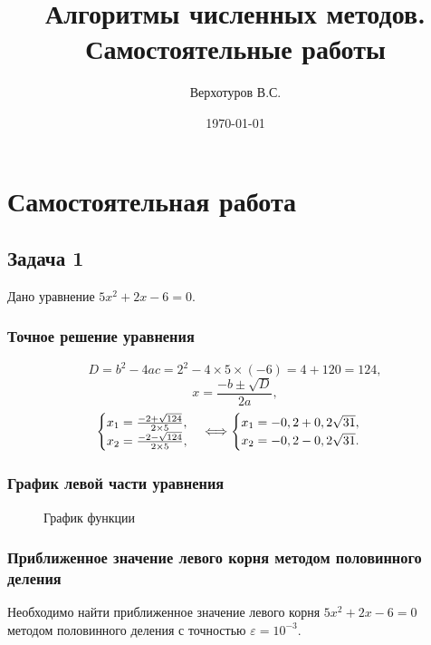 \documentclass[10pt, a4paper, titlepage]{article}
\title{Алгоритмы численных методов. \\ Самостоятельные работы}
\author{Верхотуров В.С.}
\affil{БСБО-05-20}
\affil{РТУ МИРЭА}
\date\today
\begin{document}
\maketitle
\tableofcontents
\newpage

\section{Самостоятельная работа }

\subsection{Задача 1}

Дано уравнение $5x^2+2x-6=0$.

\subsubsection*{Точное решение уравнения}
$$D=b^2-4ac=2^2-4\times5\times(-6)=4+120=124,$$
$$x=\frac{-b\pm\sqrt{D}}{2a},$$
\begin{equation*}
    \begin{cases}
        $$x_1=\frac{-2+\sqrt{124}}{2\times5}$$, \\
        $$x_2=\frac{-2-\sqrt{124}}{2\times5}$$,
    \end{cases}
    \Longleftrightarrow
    \begin{cases}
        $$x_1=-0,2+0,2\sqrt{31}$$, \\
        $$x_2=-0,2-0,2\sqrt{31}$$.
    \end{cases}
\end{equation*} 

\subsubsection*{График левой части уравнения}
\begin{figure}[H]
    \centering
    \caption{График функции}
    \label{sr1Task1Function}
\end{figure}

\subsubsection*{Приближенное значение левого корня методом половинного деления}
Необходимо найти приближенное значение левого корня $5x^2+2x-6=0$ методом половинного деления с точностью $\varepsilon=10^{-3}$.
\end{document}
